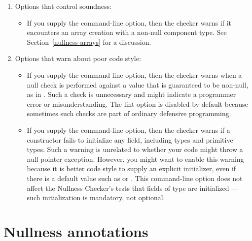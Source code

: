 \label{lint-nulltest-section}\label{lint-uninitialized-section}
\begin{enumerate}
\item
  Options that control soundness:

\begin{itemize}
\item
  \label{lint-nonnullarraycomponents-item}%
  If you supply the  command-line
  option, then the checker warns if it encounters an array creation
  with a non-null component type.
  See Section~\ref{nullness-arrays} for a discussion.
\end{itemize}

\item
  Options that warn about poor code style:

\begin{itemize}
\item
  \label{lint-nulltest-item}%
  If you supply the  command-line option, then the
  checker warns when a null check is performed against a value that is
  guaranteed to be non-null, as in .  Such a check is
  unnecessary and might indicate a programmer error or misunderstanding.
  The lint option is disabled by default because sometimes such checks are
  part of ordinary defensive programming.

\item
  \label{lint-uninitialized-item}%
  If you supply the  command-line option, then
  the checker warns if a constructor fails to initialize any field,
  including  types and primitive
  types.  Such a warning is unrelated to whether your code might throw a
  null pointer exception.  However, you might want to enable this warning
  because it is better code style to supply an explicit initializer, even
  if there is a default value such as  or .
  This command-line option does not affect the Nullness Checker's tests
  that fields of  type are
  initialized --- such initialization is mandatory, not optional.
\end{itemize}

\end{enumerate}


\section{Nullness annotations\label{nullness-annotations}}

